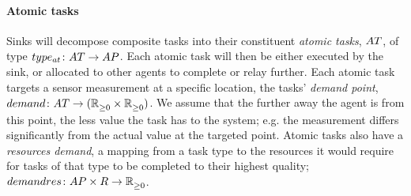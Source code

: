 \paragraph{Atomic tasks}
\label{section:problem:atomic_tasks}
Sinks will decompose composite tasks into their constituent \textit{atomic tasks}, $\setAtomicTask{}{}$, of type $\formalAtomicTaskType{}{}$. Each atomic task will then be either executed by the sink, or allocated to other agents to complete or relay further. Each atomic task targets a sensor measurement at a specific location, the tasks' \textit{demand point}, $\formalTaskDemandPoint{}{}$. We assume that the further away the agent is from this point, the less value the task has to the system; e.g. the measurement differs significantly from the actual value at the targeted point. Atomic tasks also have a \textit{resources demand}, a mapping from a task type to the resources it would require for tasks of that type to be completed to their highest quality; $\formalRequiredResources{}{}$.

